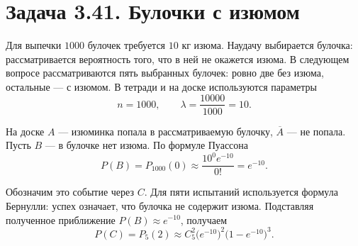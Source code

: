 \section*{Задача 3.41. Булочки с изюмом}
Для выпечки $1000$ булочек требуется $10$ кг изюма.
Наудачу выбирается булочка: рассматривается вероятность того,
что в ней не окажется изюма. В следующем вопросе рассматриваются
пять выбранных булочек: ровно две без изюма, остальные --- с изюмом.
В тетради и на доске используются параметры
\[
 n=1000,\qquad \lambda=\frac{10000}{1000}=10.
\]

На доске $A$ --- изюминка попала в рассматриваемую булочку,
$\overline A$ --- не попала. Пусть $B$ --- в булочке нет изюма.
По формуле Пуассона
\[
 P(B)=P_{1000}(0)\approx\frac{10^0e^{-10}}{0!}=e^{-10}.
\]

Обозначим это событие через $C$. Для пяти испытаний используется
формула Бернулли: успех означает, что булочка не содержит изюма.
Подставляя полученное приближение $P(B)\approx e^{-10}$, получаем
\[
 \boxed{P(C)=P_5(2)\approx C_5^2\bigl(e^{-10}\bigr)^2
 \bigl(1-e^{-10}\bigr)^3.}
\]

